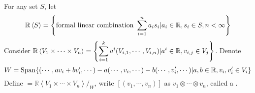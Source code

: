 For any set  $ S $, let 
\begin{equation}
    \name{$ \mathbb{R}\left<S\right> $}=\left\{\text{formal linear combination }\dps\sum_{i=1}^na_is_i|a_i\in\mathbb{R},s_i\in S,n<\infty\right\}
\end{equation} 
Consider  $ \mathbb{R}\left<V_1\times \cdots \times V_n\right>=\left\{\displaystyle\sum_{i=1}^ka^i(V_{i,1},\cdots,V_{i,n})|a^i\in\mathbb{R},v_{i,j}\in V_j\right\} $. Denote 
\begin{equation}
    W=\mathrm{Span}\{(\cdots,av_i+bv_i',\cdots)-a(\cdots,v_i,\cdots)-b(\cdots,v_i',\cdots)|a,b\in \mathbb{R},v_i,v_i'\in V_i\}
\end{equation}
Define  $ =\mathbb{R}\left<V_1\times \cdots\times V_n\right>/_W $, write  $ \left[(v_1,\cdots,v_n)\right] $ as  $ v_1\otimes \cdots\otimes v_n $, called a .   

